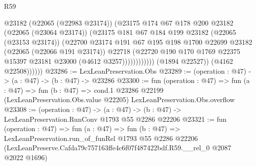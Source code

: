 \begin{lexlean}{R59}
\begin{coremodule}
                              @23182
                              (@22065 (@22983 @23174))
                              (@23175
                                @174
                                @67
                                @178
                                @200
                                @23182
                                (@22065 (@23064 @23174))
                                (@23175
                                  @181
                                  @67
                                  @184
                                  @199
                                  @23182
                                  (@22065 (@23153 @23174))
                                  (@22700
                                    @23174
                                    @191
                                    @67
                                    @195
                                    @198
                                    @1700
                                    @22699
                                    @23182
                                    (@22065 (@22066 @191 @23174))
                                    @22718
                                    (@22720
                                      @190
                                      @170
                                      @1769
                                      @22375
                                      @15397
                                      @23181
                                      @23000
                                      (@4612 @3257))))))))))))
                (@1894 @22527))
              (@4162 @22508))))))
@23286 := LexLeanPreservation.Obs
@23289 := (operation : @47) -> (a : @47) -> (b : @47) -> @23286
@23300 := fun (operation : @47) =>
  fun (a : @47) =>
  fun (b : @47) =>
  cond.{1} @23286 @22199 (LexLeanPreservation.Obs.value @22205) LexLeanPreservation.Obs.overflow
@23308 := (operation : @47) ->
  (a : @47) -> (b : @47) -> LexLeanPreservation.RunConv @1793 @55 @2286 @22206
@23321 := fun (operation : @47) =>
  fun (a : @47) =>
  fun (b : @47) =>
  LexLeanPreservation.run_of_funRel
    @1793
    @55
    @2286
    @22206
    (LexLeanPreserve.Cafda79c757163ffe4c6f07f487422bdf.R59.__rel_0 @2087 @2022 @1696)
\end{coremodule}
\end{lexlean}
